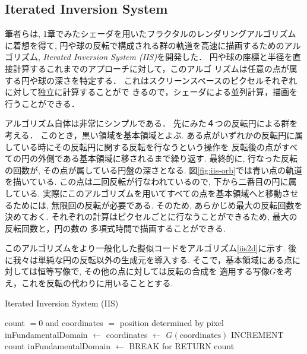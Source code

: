\subsection{Iterated Inversion System}

筆者らは, 1章でみたシェーダを用いたフラクタルのレンダリングアルゴリズム
に着想を得て, 円や球の反転で構成される群の軌道を高速に描画するためのアル
ゴリズム, \textit{Iterated Inversion System (IIS)}\cite{iis}を開発した．
円や球の座標と半径を直接計算するこれまでのアプローチに対して，このアルゴ
リズムは任意の点が属する円や球の深さを特定する．
これはスクリーンスペースのピクセルそれぞれに対して独立に計算することがで
きるので，シェーダによる並列計算，描画を行うことができる．

アルゴリズム自体は非常にシンプルである．
先にみた４つの反転円による群を考える．
このとき，黒い領域を基本領域とよぶ.
ある点がいずれかの反転円に属している時にその反転円に関する反転を行なうという操作を
反転後の点がすべての円の外側である基本領域に移されるまで繰り返す.
最終的に, 行なった反転の回数が, その点が属している円盤の深さとなる.
図\ref{fig:iis-orb}では青い点の軌道を描いている.
この点は二回反転が行なわれているので, 下から二番目の円に属している.
実際にこのアルゴリズムを用いてすべての点を基本領域へと移動させるためには,
無限回の反転が必要である. そのため, あらかじめ最大の反転回数を決めておく.
それぞれの計算はピクセルごとに行なうことができるため, 最大の反転回数と，円の数の
多項式時間で描画することができる.

このアルゴリズムをより一般化した擬似コードをアルゴリズム\ref{iis2d}に示す.
後に我々は単純な円の反転以外の生成元を導入する.
そこで，基本領域にある点に対しては恒等写像で, その他の点に対しては反転の合成を
適用する写像$G$を考え，これを反転の代わりに用いることとする.

 \begin{algorithm}
  \caption{Iterated Inversion System (IIS)}
  \label{iis2d}
  \begin{algorithmic}
   \REQUIRE count $= 0$ and coordinates $=$ position determined by
   pixel
   \STATE inFundamentalDomain $\leftarrow$ \TRUE
   \STATE coordinates $\leftarrow$ $G(\text{coordinates})$
   \STATE INCREMENT count
   \STATE inFundamentalDomain $\leftarrow$ \FALSE
   \ENDIF
   \ENDFOR
   \STATE BREAK for
   \ENDIF
   \ENDFOR
   \STATE RETURN count
  \end{algorithmic}
 \end{algorithm}

